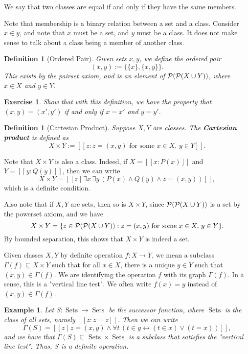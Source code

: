 \documentclass[10pt]{article}
\DeclareMathOperator{\Sets}{Sets}
\theoremstyle{newstyle}
\newtheorem{defn}[thm]{Definition}
\newtheorem{exercise}[thm]{Exercise}
\newtheorem{exmp}[thm]{Example}
\begin{document}
We say that two classes are equal if and only if they have the same members. 

Note that membership is a binary relation between a set and a class. Consider $x \in y$, and 
note that $x$ must be a set, and $y$ must be a class. It does not make sense to talk about a 
class being a member of another class. 

\begin{defn}[Ordered Pair] 
Given sets $x, y$, we define the ordered pair 
\[ (x, y) := \{\{x\}, \{x,y\}\}. \] 
This exists by the pairset axiom, and is an element of ${\cal P(P}(X \cup Y))$, where 
$x \in X$ and $y \in Y$.
\end{defn}

\begin{exercise}
Show that with this definition, we have the property that $(x, y) = (x', y')$ if and only if 
$x = x'$ and $y = y'$.
\end{exercise}

\begin{defn}[Cartesian Product] 
Suppose $X, Y$ are classes. The {\bf Cartesian product} is defined as 
\[ X \times Y := [[ z : z = (x, y) \text{ for some } x \in X,\, y \in Y]]. \] 
\end{defn} 

Note that $X \times Y$ is also a class. Indeed, if $X = [[x : P(x)]]$ and 
$Y = [[y : Q(y)]]$, then we can write 
\[ X \times Y = [[ z \mid \exists x \, \exists y \, (P(x) \wedge Q(y) \wedge z = (x, y)) ]], \] 
which is a definite condition. 

Also note that if $X, Y$ are sets, then so is $X \times Y$, since 
${\cal P(P}(X \cup Y))$ is a set by the powerset axiom, and we have 
\[ X \times Y = \{z \in {\cal P(P}(X \cup Y)) : z = (x, y) \text{ for some } x \in X,\, y \in Y\}. \] 
By bounded separation, this shows that $X \times Y$ is indeed a set. 

Given classes $X, Y$ by definite operation $f : X \to Y$, we mean a subclass 
$\Gamma(f) \subseteq X \times Y$ such that for all $x \in X$, there is a unique $y \in Y$ 
such that $(x, y) \in \Gamma(f)$. 
We are identifying the operation $f$ with its graph $\Gamma(f)$. In a sense, this is a 
"vertical line test". 
We often write $f(x) = y$ instead of $(x, y) \in \Gamma(f)$. 

\begin{exmp} 
Let $S : \Sets \to \Sets$ be the successor function, where $\Sets$ is the class of all sets, 
namely $[[z : z = z]]$. Then we can write 
\[ \Gamma(S) = [[z \mid z = (x, y) \wedge \forall t \, (t \in y \leftrightarrow (t \in x) 
\vee (t = x)) ]], \] 
and we have that $\Gamma(S) \subseteq \Sets \times \Sets$ is a subclass that satisfies the 
"vertical line test". Thus, $S$ is a definite operation. 
\end{exmp}
\end{document}
